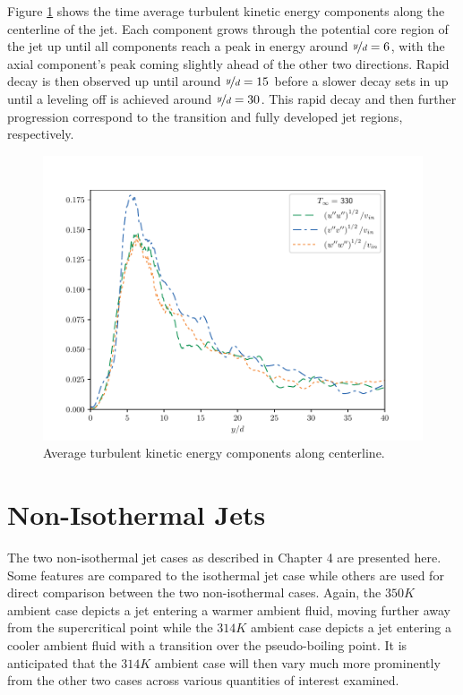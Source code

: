 Figure \ref{330_TKE_features} shows the time average turbulent kinetic energy components along the centerline of the jet. Each component grows through the potential core region of the jet up until all components reach a peak in energy around $\nicefrac{y}{d}=6$, with the axial component's peak coming slightly ahead of the other two directions. Rapid decay is then observed up until around $\nicefrac{y}{d} = 15$ before a slower decay sets in up until a leveling off is achieved around $\nicefrac{y}{d} = 30$. This rapid decay and then further progression correspond to the transition and fully developed jet regions, respectively.   

\begin{figure}[hbtp!]
\begin{center}
	\includegraphics[scale=.7]{figures/Plots/centerline/330_TKEuvw_centerline.pdf}
	\caption{Average turbulent kinetic energy components along centerline.} \label{330_TKE_features}
\end{center}
\end{figure}

\section{Non-Isothermal Jets}
The two non-isothermal jet cases as described in Chapter 4 are presented here. Some features are compared to the isothermal jet case while others are used for direct comparison between the two non-isothermal cases. Again, the $350 K$ ambient case depicts a jet entering a warmer ambient fluid, moving further away from the supercritical point while the $314 K$ ambient case depicts a jet entering a cooler ambient fluid with a transition over the pseudo-boiling point. It is anticipated that the $314 K$ ambient case will then vary much more prominently from the other two cases across various quantities of interest examined. 
